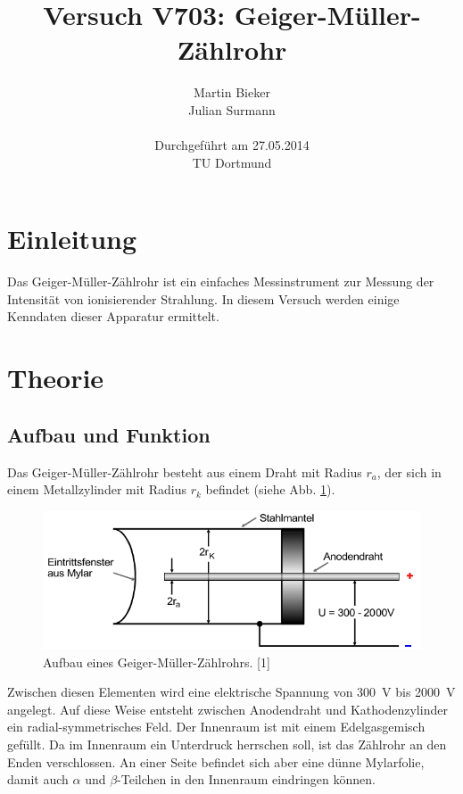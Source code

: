 \documentclass[11pt,ngerman,a4paper]{article}
\title{\textbf{Versuch V703: Geiger-Müller-Zählrohr}}
\author{Martin Bieker\\
		Julian Surmann\\
		\\
		Durchgef\"{u}hrt am 27.05.2014\\
		TU Dortmund}
\date{}
\begin{document}
\renewcommand\tablename{Tabelle}
\renewcommand\figurename{Abbildung}
\maketitle
\thispagestyle{empty}
\newpage
\clearpage
\setcounter{page}{1}


\section{Einleitung}
Das Geiger-Müller-Zählrohr ist ein einfaches Messinstrument zur Messung der Intensität von ionisierender Strahlung. In diesem Versuch werden einige Kenndaten dieser Apparatur ermittelt.
\section{Theorie}
\subsection{Aufbau und Funktion} 
 Das Geiger-Müller-Zählrohr besteht aus einem Draht  mit Radius $r_a$, der sich in einem Metallzylinder mit Radius $r_k$ befindet (siehe Abb. \ref{abb1}). 
\begin{figure}[htp]
\centering
\includegraphics[scale=0.6]{abb1.png}
\caption{Aufbau eines Geiger-Müller-Zählrohrs. [1]}
\label{abb1}
\end{figure} 
Zwischen diesen Elementen wird eine elektrische Spannung von \SI{300}{\volt} bis \SI{2000}{\volt} angelegt. Auf diese Weise entsteht zwischen Anodendraht und Kathodenzylinder ein radial-symmetrisches Feld. Der Innenraum ist mit einem  Edelgasgemisch gefüllt. Da im Innenraum ein Unterdruck herrschen soll, ist das Zählrohr an den Enden verschlossen. An einer Seite befindet sich aber eine dünne Mylarfolie, damit  auch $\alpha$ und $\beta$-Teilchen in den Innenraum eindringen können.
 
\end{document}
